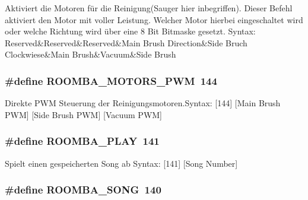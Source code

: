 Aktiviert die Motoren für die Reinigung(\-Sauger hier inbegriffen). Dieser Befehl aktiviert den Motor mit voller Leistung. Welcher Motor hierbei eingeschaltet wird oder welche Richtung wird über eine 8 Bit Bitmaske gesetzt. Syntax\-: Reserved\&Reserved\&Reserved\&Main Brush Direction\&Side Bruch Clockwiese\&Main Brush\&Vacuum\&Side Brush \hypertarget{group__roomba__commands__motor_ga7fba3d9876ee967f6bbefc85a05e8fed}{
\subsubsection[{R\-O\-O\-M\-B\-A\-\_\-\-M\-O\-T\-O\-R\-S\-\_\-\-P\-W\-M}]{\setlength{\rightskip}{0pt plus 5cm}\#define R\-O\-O\-M\-B\-A\-\_\-\-M\-O\-T\-O\-R\-S\-\_\-\-P\-W\-M~144}}\label{group__roomba__commands__motor_ga7fba3d9876ee967f6bbefc85a05e8fed}
Direkte P\-W\-M Steuerung der Reinigungsmotoren.\-Syntax\-: \mbox{[}144\mbox{]} \mbox{[}Main Brush P\-W\-M\mbox{]} \mbox{[}Side Brush P\-W\-M\mbox{]} \mbox{[}Vacuum P\-W\-M\mbox{]} \hypertarget{group__roomba__commands__motor_ga47c9ccefb9e9e34108cc37339ae60f58}{
\subsubsection[{R\-O\-O\-M\-B\-A\-\_\-\-P\-L\-A\-Y}]{\setlength{\rightskip}{0pt plus 5cm}\#define R\-O\-O\-M\-B\-A\-\_\-\-P\-L\-A\-Y~141}}\label{group__roomba__commands__motor_ga47c9ccefb9e9e34108cc37339ae60f58}
Spielt einen gespeicherten Song ab Syntax\-: \mbox{[}141\mbox{]} \mbox{[}Song Number\mbox{]} \hypertarget{group__roomba__commands__motor_gade5b4a0d2f24f3f551bf43aedbf6e653}{
\subsubsection[{R\-O\-O\-M\-B\-A\-\_\-\-S\-O\-N\-G}]{\setlength{\rightskip}{0pt plus 5cm}\#define R\-O\-O\-M\-B\-A\-\_\-\-S\-O\-N\-G~140}}\label{group__roomba__commands__motor_gade5b4a0d2f24f3f551bf43aedbf6e653}
